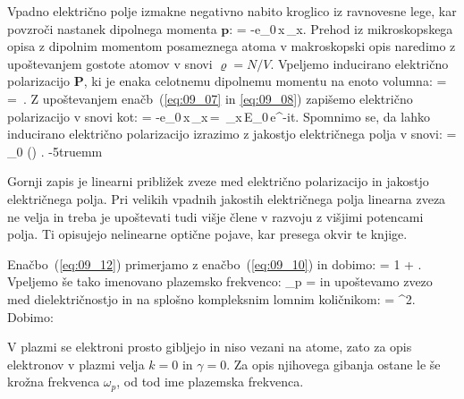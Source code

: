 Vpadno električno polje izmakne negativno nabito kroglico iz ravnovesne 
lege, kar povzroči nastanek dipolnega momenta $\mathbf{p}$:
\beq
{} = -e_0\,x\,_x.
\label{eq:09_08}
\eeq
Prehod iz mikroskopskega opisa z dipolnim momentom posameznega atoma 
v makroskopski opis naredimo z upoštevanjem gostote atomov v snovi 
$\varrho = N/V$. Vpeljemo inducirano električno polarizacijo $\mathbf{P}$, ki 
je enaka celotnemu dipolnemu momentu na enoto volumna:
\beq
{} =  = \,\varrho. 
\label{eq:09_09}
\eeq
Z upoštevanjem enačb~(\ref{eq:09_07} in \ref{eq:09_08}) zapišemo 
električno polarizacijo v snovi kot:
\beq
{} = -e_0\,x\,_x\,\varrho = \,_x\,E_0\,e^{-i\omega t}.
\label{eq:09_10}
\eeq
Spomnimo se, da lahko inducirano električno polarizacijo izrazimo z jakostjo
električnega polja v snovi:
\beq
{} = \varepsilon_0 () .
\label{eq:09_12}
\eeq
\vglue-5truemm
\begin{remark}
Gornji zapis je linearni približek zveze med električno polarizacijo in 
jakostjo električnega polja. Pri velikih vpadnih jakostih električnega polja linearna zveza 
ne velja in treba je upoštevati tudi višje člene v razvoju z višjimi potencami polja. Ti
opisujejo nelinearne optične pojave, kar presega okvir te knjige.
\end{remark}

Enačbo~(\ref{eq:09_12}) primerjamo z enačbo~(\ref{eq:09_10}) in dobimo:
\beq
\varepsilon= 1 + .
\label{eq:09_13}
\eeq
Vpeljemo še tako imenovano plazemsko frekvenco:
\beq
\omega_p = 
\label{eq:09_14}
\eeq
in upoštevamo zvezo med dielektričnostjo in na splošno kompleksnim lomnim količnikom:
\beq
\varepsilon = ^2.
\label{eq:09_15}
\eeq
Dobimo:
\begin{remark}
V plazmi se elektroni prosto gibljejo in niso vezani na atome,
zato za opis elektronov v plazmi velja $k=0$ in $\gamma = 0$. Za opis njihovega
gibanja ostane le še krožna frekvenca $\omega_p$, od tod ime plazemska frekvenca.
\end{remark}

